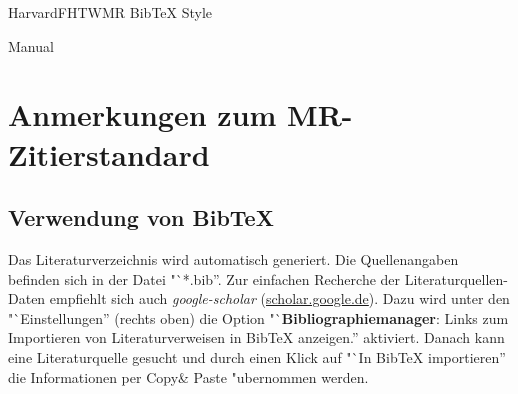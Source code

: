\documentclass[a4paper,bibtotoc,oneside]{scrbook}
\begin{document}
\newcommand{\citepic}[1]{(Quelle: \protect\cite{#1})}%
\newcommand{\citefig}[2]{(Quelle: \protect\cite{#1}, S. #2)}%
\newcommand{\citefigm}[2]{(Quelle: modifiziert "ubernommen aus \protect\cite{#1}, S. #2)}%
\newcommand{\citep}{\citeasnoun}%
\newcommand{\acessedthrough}{Verf{\"u}gbar unter:}%
\newcommand{\acessedthroughp}{Verf{\"u}gbar bei:}%
\newcommand{\acessedat}{Zugang am}%
\newcommand{\singlepage}{S.}%
\newcommand{\multiplepages}{S.}%
\newcommand{\chapternr}{K.}%
\renewcommand{\harvardand}{\&}%
\newcommand{\abstractonly}{ausschließlich Abstract}
\newcommand{\edition}{. Auflage}%


\thispagestyle{empty}
\begin{center}
\begin{Huge}
HarvardFHTWMR BibTeX Style
\end{Huge}

\vspace{20pt}
\begin{LARGE}
Manual
\end{LARGE}
\end{center}


\newpage

\tableofcontents\thispagestyle{empty}
\newpage

\chapter{Anmerkungen zum MR-Zitierstandard}

\section{Verwendung von BibTeX}

Das Literaturverzeichnis wird automatisch generiert. Die Quellenangaben befinden sich in der Datei "`*.bib''. Zur einfachen Recherche der Literaturquellen-Daten empfiehlt sich auch \textit{google-scholar} (\url{scholar.google.de}). Dazu wird unter den "`Einstellungen'' (rechts oben) die Option  "`\textbf{Bibliographiemanager}: Links zum Importieren von Literaturverweisen in BibTeX anzeigen.'' aktiviert. Danach kann eine Literaturquelle gesucht und durch einen Klick auf "`In BibTeX importieren'' die Informationen per Copy\& Paste "ubernommen werden.\\
\end{document}
